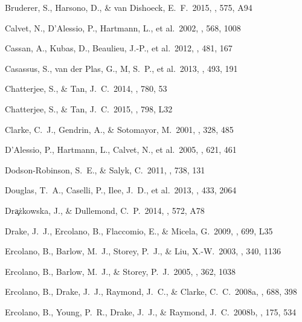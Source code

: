 \begin{thebibliography}{2000b}
 Bruderer, S., Harsono, D., \& van Dishoeck, E.~F.\ 2015, \aap, 575, A94 

 Calvet, N., D'Alessio, 
P., Hartmann, L., et al.\ 2002, \apj, 568, 1008 

 Cassan, A., Kubas, D., 
Beaulieu, J.-P., et al.\ 2012, \nat, 481, 167 

 Casassus, S., van der 
Plas, G., M, S.~P., et al.\ 2013, \nat, 493, 191 

 Chatterjee, S., \& Tan, J.~C.\ 2014, \apj, 780, 53

 Chatterjee, S.,
  \& Tan, J.~C.\ 2015, \apjl, 798, L32

 Clarke, C.~J., Gendrin, 
A., \& Sotomayor, M.\ 2001, \mnras, 328, 485 


 D'Alessio, P., 
Hartmann, L., Calvet, N., et al.\ 2005, \apj, 621, 461 


 Dodson-Robinson, S.~E., \& Salyk, C.\ 2011, \apj, 738, 131 

 Douglas, T.~A., 
Caselli, P., Ilee, J.~D., et al.\ 2013, \mnras, 433, 2064 

 Dr{\c a}{\.z}kowska, J., \& Dullemond, C.~P.\ 2014, \aap, 572, A78 

 Drake, J.~J., Ercolano, 
B., Flaccomio, E., \& Micela, G.\ 2009, \apjl, 699, L35 


 Ercolano, B., Barlow, 
M.~J., Storey, P.~J., \& Liu, X.-W.\ 2003, \mnras, 340, 1136 

 Ercolano, B., Barlow, 
M.~J., \& Storey, P.~J.\ 2005, \mnras, 362, 1038 

 Ercolano, B., Drake, 
J.~J., Raymond, J.~C., \& Clarke, C.~C.\ 2008a, \apj, 688, 398 

 Ercolano, B., Young, 
P.~R., Drake, J.~J., \& Raymond, J.~C.\ 2008b, \apjs, 175, 534 


\end{thebibliography}
